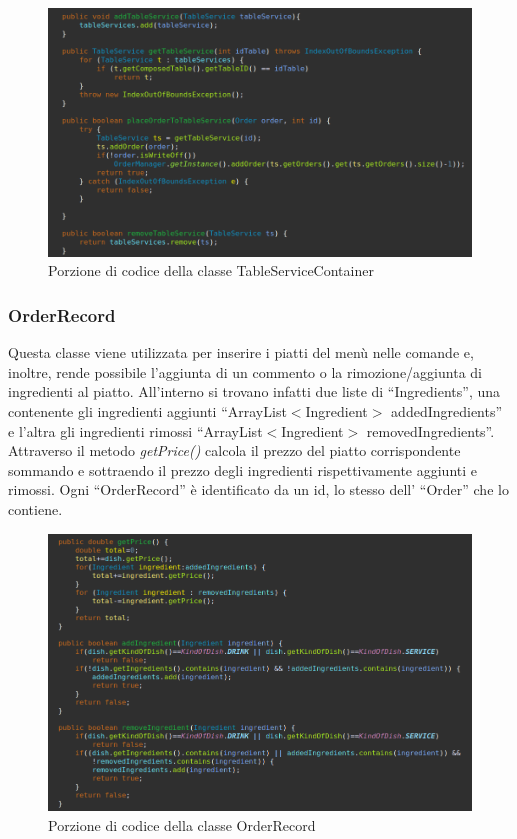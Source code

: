\documentclass{article}
\begin{document}
\begin{figure}[!h]
\centering
\includegraphics[width= 14cm]{"Codice/TableServiceContainer.PNG"}
\caption{Porzione di codice della classe TableServiceContainer}
\end{figure}

\newpage

\subsubsection{OrderRecord}

Questa classe viene utilizzata per inserire i piatti del men\`u nelle comande e, inoltre, rende possibile l'aggiunta di un commento o la rimozione/aggiunta di ingredienti al piatto. All'interno si trovano infatti due liste di ``Ingredients'', una contenente gli ingredienti aggiunti ``ArrayList$<$Ingredient$>$ addedIngredients'' e l'altra gli ingredienti rimossi ``ArrayList$<$Ingredient$>$  removedIngredients''. Attraverso il metodo \textit{getPrice()} calcola il prezzo del piatto corrispondente sommando e sottraendo il prezzo degli ingredienti rispettivamente aggiunti e rimossi. Ogni ``OrderRecord'' \`e identificato da un id, lo stesso dell' ``Order'' che lo contiene.


\begin{figure}[!h]
\centering
\includegraphics[width= 14cm]{"Codice/OrderRecord.PNG"}
\caption{Porzione di codice della classe OrderRecord}
\end{figure}
\end{document}
